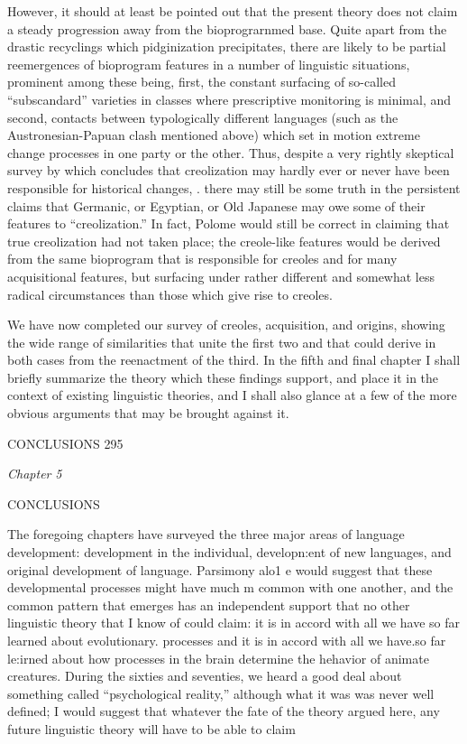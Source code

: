 However, it should at least be pointed out that the present theory does not claim a steady progression away from the biopro\-grarnmed base. Quite apart from the drastic recyclings which pidginiza\-tion precipitates, there are likely to be partial reemergences of bio\-program features in a number of linguistic situations, prominent among these being, first, the constant surfacing of so-called ``subscandard'' varieties in classes where prescriptive monitoring is minimal, and second, contacts between typologically different languages (such as the Austronesian-Papuan clash mentioned above) which set in motion extreme change processes in one party or the other. Thus, despite a very rightly skeptical survey by \citet{Polome1980} which concludes that creolization may hardly ever or never have been responsible for histo\-rical changes, . there may still be some truth in the persistent claims that Germanic, or Egyptian, or Old Japanese may owe some of their features to ``creolization.'' In fact, Polome would still be correct in claiming that true creolization had not taken place; the creole-like features would be derived from the same bioprogram that is responsible for creoles and for many acquisitional features, but surfacing under rather different and somewhat less radical circumstances than those which give rise to creoles.

We have now completed our survey of creoles, acquisition, and origins, showing the wide range of similarities that unite the first two and that could derive in both cases from the reenactment of the third. In the fifth and final chapter I shall briefly summarize the theory which these findings support, and place it in the context of existing linguistic theories, and I shall also glance at a few of the more obvious arguments that may be brought against it.

CONCLUSIONS 295

\textit{Chapter} \textit{5}

CONCLUSIONS

The foregoing chapters have surveyed the three major areas of language development: development in the individual, developn:ent of new languages, and original development of language. Parsimony alo1 e would suggest that these developmental processes might have much m common with one another, and the common pattern that emerges has an independent support that no other linguistic theory that I know of could claim: it is in accord with all we have so far learned about evo\-lutionary. processes and it is in accord with all we have.so far le:irned about how processes in the brain determine the hehavior of animate creatures. During the sixties and seventies, we heard a good deal about something called ``psychological reality,'' although what it was was never well defined; I would suggest that whatever the fate of the theory argued here, any future linguistic theory will have to be able to claim

